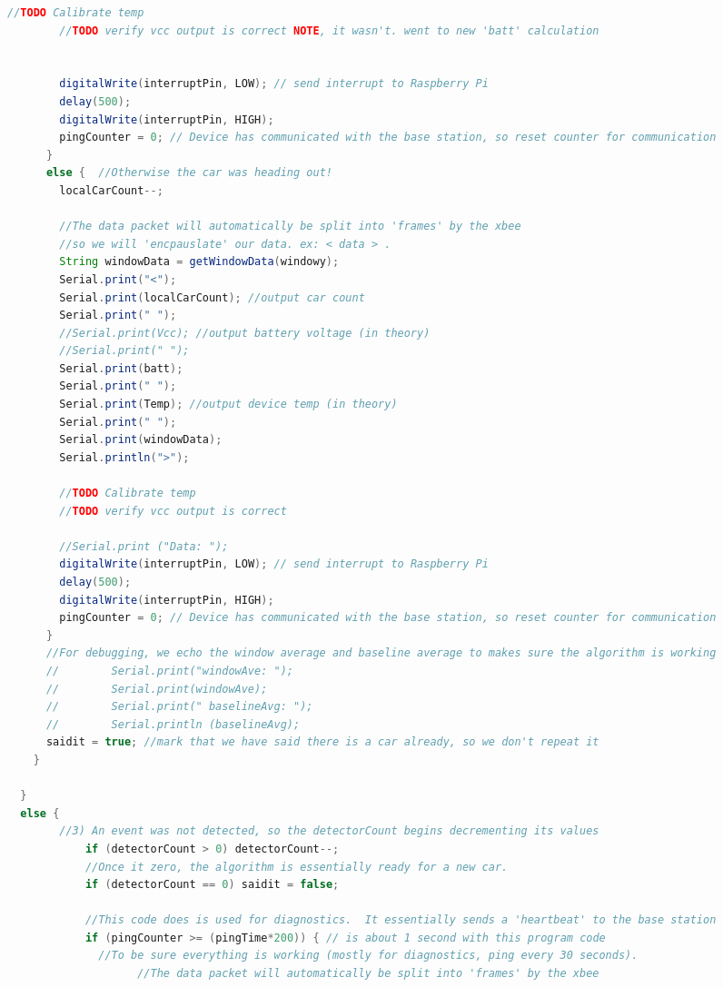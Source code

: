 \documentclass[11pt, oneside, fullpage, doublespace]{article}
\begin{document}
\begin{spacing}{1}
\begin{lstlisting}[language=java]
        //TODO Calibrate temp
        //TODO verify vcc output is correct NOTE, it wasn't. went to new 'batt' calculation


        digitalWrite(interruptPin, LOW); // send interrupt to Raspberry Pi 
        delay(500);
        digitalWrite(interruptPin, HIGH);
        pingCounter = 0; // Device has communicated with the base station, so reset counter for communication
      } 
      else {  //Otherwise the car was heading out!
        localCarCount--;

        //The data packet will automatically be split into 'frames' by the xbee 
        //so we will 'encpauslate' our data. ex: < data > .
        String windowData = getWindowData(windowy);
        Serial.print("<");
        Serial.print(localCarCount); //output car count
        Serial.print(" ");
        //Serial.print(Vcc); //output battery voltage (in theory)
        //Serial.print(" ");
        Serial.print(batt);
        Serial.print(" ");
        Serial.print(Temp); //output device temp (in theory)
        Serial.print(" ");
        Serial.print(windowData);
        Serial.println(">");
        
        //TODO Calibrate temp
        //TODO verify vcc output is correct

        //Serial.print ("Data: ");
        digitalWrite(interruptPin, LOW); // send interrupt to Raspberry Pi 
        delay(500);
        digitalWrite(interruptPin, HIGH);
        pingCounter = 0; // Device has communicated with the base station, so reset counter for communication
      }
      //For debugging, we echo the window average and baseline average to makes sure the algorithm is working
      //        Serial.print("windowAve: ");
      //        Serial.print(windowAve);
      //        Serial.print(" baselineAvg: ");
      //        Serial.println (baselineAvg);
      saidit = true; //mark that we have said there is a car already, so we don't repeat it
    }

  } 
  else {
        //3) An event was not detected, so the detectorCount begins decrementing its values
            if (detectorCount > 0) detectorCount--;
            //Once it zero, the algorithm is essentially ready for a new car.
            if (detectorCount == 0) saidit = false;
        
            //This code does is used for diagnostics.  It essentially sends a 'heartbeat' to the base station
            if (pingCounter >= (pingTime*200)) { // is about 1 second with this program code 
              //To be sure everything is working (mostly for diagnostics, ping every 30 seconds).
                    //The data packet will automatically be split into 'frames' by the xbee 
        

\end{lstlisting}
\end{spacing}
\end{document}
